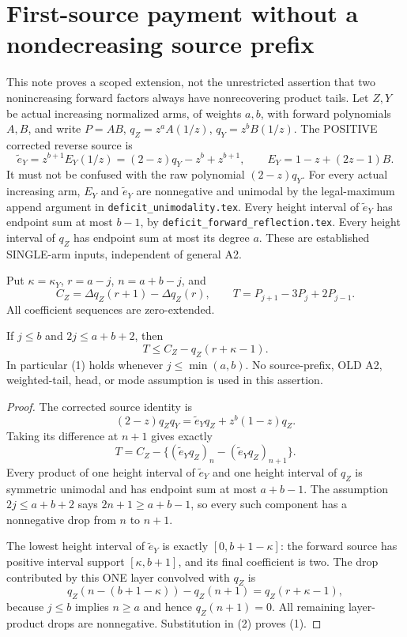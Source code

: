 \section{First-source payment without a nondecreasing source prefix}
This note proves a scoped extension, not the unrestricted assertion that
two nonincreasing forward factors always have nonrecovering product tails.
Let $Z,Y$ be actual increasing normalized arms, of weights $a,b$,
with forward polynomials $A,B$, and write $P=AB$,
$q_Z=z^aA(1/z)$, $q_Y=z^bB(1/z)$.
The POSITIVE corrected reverse source is
\[
 \widetilde e_Y=z^{b+1}E_Y(1/z)
    =(2-z)q_Y-z^b+z^{b+1},
 \qquad E_Y=1-z+(2z-1)B.
\]
It must not be confused with the raw polynomial $(2-z)q_Y$.
For every actual increasing arm, $E_Y$ and $\widetilde e_Y$ are
nonnegative and unimodal by the legal-maximum append argument in
\texttt{deficit\_unimodality.tex}. Every height interval of
$\widetilde e_Y$ has endpoint sum at most $b-1$, by
\texttt{deficit\_forward\_reflection.tex}. Every height interval
of $q_Z$ has endpoint sum at most its degree $a$.
These are established SINGLE-arm inputs, independent of general A2.

Put $\kappa=\kappa_Y$, $r=a-j$, $n=a+b-j$, and
\[
 C_Z=\Delta q_Z(r+1)-\Delta q_Z(r),\qquad
 T=P_{j+1}-3P_j+2P_{j-1}.
\]
All coefficient sequences are zero-extended.

\begin{proposition}
If $j\le b$ and $2j\le a+b+2$, then
\[
 \boxed{T\le C_Z-q_Z(r+\kappa-1).}                 \tag{1}
\]
In particular (1) holds whenever $j\le\min(a,b)$.
No source-prefix, OLD A2, weighted-tail, head, or mode assumption
is used in this assertion.
\end{proposition}
\begin{proof}
The corrected source identity is
\[
 (2-z)q_Zq_Y=\widetilde e_Yq_Z+z^b(1-z)q_Z.
\]
Taking its difference at $n+1$ gives exactly
\[
 T=C_Z-\{(\widetilde e_Yq_Z)_n
                  -(\widetilde e_Yq_Z)_{n+1}\}.    \tag{2}
\]
Every product of one height interval of $\widetilde e_Y$ and
one height interval of $q_Z$ is symmetric unimodal and has
endpoint sum at most $a+b-1$. The assumption
$2j\le a+b+2$ says $2n+1\ge a+b-1$, so every such
component has a nonnegative drop from $n$ to $n+1$.

The lowest height interval of $\widetilde e_Y$ is exactly
$[0,b+1-\kappa]$: the forward source has positive interval
support $[\kappa,b+1]$, and its final coefficient is two.
The drop contributed by this ONE layer convolved with $q_Z$ is
\[
 q_Z(n-(b+1-\kappa))-q_Z(n+1)
   =q_Z(r+\kappa-1),
\]
because $j\le b$ implies $n\ge a$ and hence $q_Z(n+1)=0$.
All remaining layer-product drops are nonnegative. Substitution
in (2) proves (1).
\end{proof}

